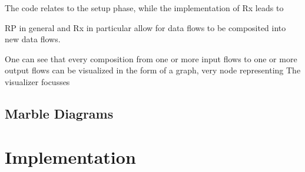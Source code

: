  The code relates to the setup phase, while the implementation of Rx leads to

RP in general and Rx in particular allow for data flows to be composited into new data flows. 


One can see that every composition from one or more input flows to one or more output flows can be visualized in the form of a graph, very node representing 
The visualizer focusses 

\subsection{Marble Diagrams}


\section{Implementation}